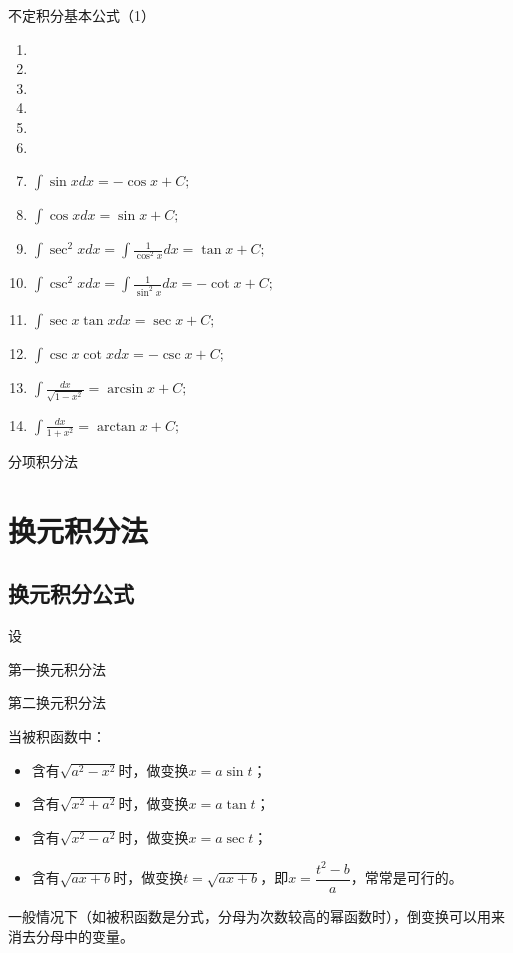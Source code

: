 \noindent 不定积分基本公式（1）
\begin{enumerate}
    \item 
    \item 
    \item 
    \item 
    \item 
    \item 
    \item $\int \sin xdx=-\cos x+C;$
    \item $\int \cos xdx=\sin x+C;$
    \item $\int \sec^2 xdx=\int \frac{1}{\cos^2 x}dx=\tan x+C;$
    \item $\int \csc^2 xdx=\int \frac{1}{\sin^2 x}dx=-\cot x+C;$
    \item $\int \sec x\tan xdx=\sec x+C;$
    \item $\int \csc x\cot xdx=-\csc x+C;$
    \item $\int\frac{dx}{\sqrt{1-x^2}}=\arcsin x+C;$
    \item $\int\frac{dx}{1+x^2}=\arctan x+C;$
\end{enumerate}

\noindent 分项积分法

\section{换元积分法}
\subsection{换元积分公式}
设

\noindent 第一换元积分法

\noindent 第二换元积分法

当被积函数中：
\begin{itemize}
    \item[$1^\circ$] 含有$\sqrt{a^2-x^2}$时，做变换$x=a\sin t$；
    \item[$2^\circ$] 含有$\sqrt{x^2+a^2}$时，做变换$x=a\tan t$；
    \item[$3^\circ$] 含有$\sqrt{x^2-a^2}$时，做变换$x=a\sec t$；
    \item[$4^\circ$] 含有$\sqrt{ax+b}$时，做变换$t=\sqrt{ax+b}$，即$x=\dfrac{t^2-b}{a}$，常常是可行的。
\end{itemize}

一般情况下（如被积函数是分式，分母为次数较高的幂函数时），倒变换可以用来消去分母中的变量。

